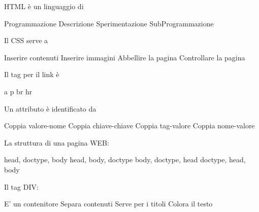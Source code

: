 \documentclass[addpoints]{exam}
\begin{document}
 
\begin{center}
\end{center} 
 
\vspace{5mm}
 
 
\vspace{5mm}
 
\begin{questions}
\begin{multicols}{2}

\question[\half] HTML è un linguaggio di
\begin{checkboxes}
	\choice Programmazione
	\choice Descrizione
	\choice Sperimentazione
	\choice SubProgrammazione
\end{checkboxes}

\question[\half] Il CSS serve a 
\begin{checkboxes}
	\choice Inserire contenuti
	\choice Inserire immagini
	\choice Abbellire la pagina
	\choice Controllare la pagina
\end{checkboxes}

\question[\half] Il tag per il link è 
\begin{checkboxes}
	\choice a
	\choice p
	\choice br
	\choice hr
\end{checkboxes}

\question[\half] Un attributo è identificato da
\begin{checkboxes}
	\choice Coppia valore-nome
	\choice Coppia chiave-chiave
	\choice Coppia tag-valore
	\choice Coppia nome-valore
\end{checkboxes}

\question[\half] La struttura di una pagina WEB:
\begin{checkboxes}
	\choice head, doctype, body
	\choice head, body, doctype
	\choice body, doctype, head
	\choice doctype, head, body
\end{checkboxes}

\question[\half] Il tag DIV:
\begin{checkboxes}
	\choice E' un contenitore
	\choice Separa contenuti
	\choice Serve per i titoli
	\choice Colora il testo
\end{checkboxes}


\end{multicols}
\end{questions}
\end{document}
